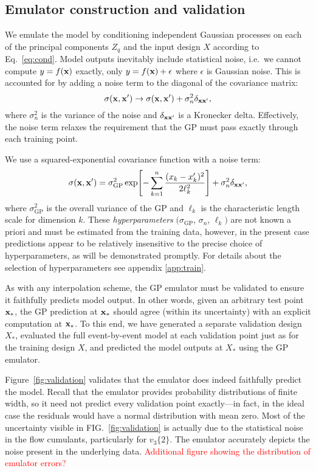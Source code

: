 \documentclass[aps,prc,reprint,superscriptaddress,amsmath]{revtex4-1}
\newcommand{\todo}[1]{\textcolor{red}{#1}}
\newcommand{\vnk}[2]{v_#1\{#2\}}
\begin{document}
\subsection{Emulator construction and validation}

We emulate the model by conditioning independent Gaussian processes on each of the principal components $Z_q$ and the input design $X$ according to Eq.~\eqref{eq:cond}.
Model outputs inevitably include statistical noise, i.e.\ we cannot compute $y = f(\mathbf x)$ exactly, only $y = f(\mathbf x) + \epsilon$ where $\epsilon$ is Gaussian noise.
This is accounted for by adding a noise term to the diagonal of the covariance matrix:
\begin{equation*}
  \sigma(\mathbf x, \mathbf x') \rightarrow \sigma(\mathbf x, \mathbf x') + \sigma^2_n\delta_{\mathbf x\mathbf x'},
\end{equation*}
where $\sigma^2_n$ is the variance of the noise and $\delta_{\mathbf x\mathbf x'}$ is a Kronecker delta.
Effectively, the noise term relaxes the requirement that the GP must pass exactly through each training point.

We use a squared-exponential covariance function with a noise term:
\begin{equation}
  \sigma(\mathbf x, \mathbf x') = \sigma_\text{GP}^2 \exp\Biggl[ -\sum_{k=1}^n \frac{(x_k - x'_k)^2}{2\ell_k^2} \Biggr] + \sigma_n^2\delta_{\mathbf x\mathbf x'},
  \label{eq:full_cov}
\end{equation}
where $\sigma_\text{GP}^2$ is the overall variance of the GP and $\ell_k$ is the characteristic length scale for dimension $k$.
These \emph{hyperparameters} $(\sigma_\text{GP}$, $\sigma_n$, $\ell_k)$ are not known a priori and must be estimated from the training data, however, in the present case predictions appear to be relatively insensitive to the precise choice of hyperparameters, as will be demonstrated promptly.
For details about the selection of hyperparameters see appendix \ref{app:train}.

As with any interpolation scheme, the GP emulator must be validated to ensure it faithfully predicts model output.
In other words, given an arbitrary test point $\mathbf x_*$, the GP prediction at $\mathbf x_*$ should agree (within its uncertainty) with an explicit computation at $\mathbf x_*$.
To this end, we have generated a separate validation design $X_*$, evaluated the full event-by-event model at each validation point just as for the training design $X$, and predicted the model outputs at $X_*$ using the GP emulator.

Figure~\ref{fig:validation} validates that the emulator does indeed faithfully predict the model.
Recall that the emulator provides probability distributions of finite width, so it need not predict every validation point exactly---in fact, in the ideal case the residuals would have a normal distribution with mean zero.
Most of the uncertainty visible in FIG.~\ref{fig:validation} is actually due to the statistical noise in the flow cumulants, particularly for $\vnk 3 2$.
The emulator accurately depicts the noise present in the underlying data.
\todo{Additional figure showing the distribution of emulator errors?}
\end{document}
